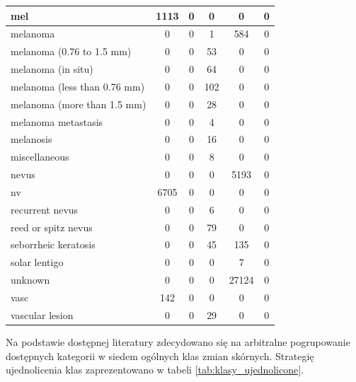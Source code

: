 \begin{table}[htbp]
\begin{tabular}{|l|c|c|c|c|c|}
		mel & 1113 & 0 & 0 & 0 & 0 \\ \hline
		melanoma & 0 & 0 & 1 & 584 & 0 \\ \hline
		melanoma (0.76 to 1.5 mm) & 0 & 0 & 53 & 0 & 0 \\ \hline
		melanoma (in situ) & 0 & 0 & 64 & 0 & 0 \\ \hline
		melanoma (less than 0.76 mm) & 0 & 0 & 102 & 0 & 0 \\ \hline
		melanoma (more than 1.5 mm) & 0 & 0 & 28 & 0 & 0 \\ \hline
		melanoma metastasis & 0 & 0 & 4 & 0 & 0 \\ \hline
		melanosis & 0 & 0 & 16 & 0 & 0 \\ \hline
		miscellaneous & 0 & 0 & 8 & 0 & 0 \\ \hline
		nevus & 0 & 0 & 0 & 5193 & 0 \\ \hline
		nv & 6705 & 0 & 0 & 0 & 0 \\ \hline
		recurrent nevus & 0 & 0 & 6 & 0 & 0 \\ \hline
		reed or spitz nevus & 0 & 0 & 79 & 0 & 0 \\ \hline
		seborrheic keratosis & 0 & 0 & 45 & 135 & 0 \\ \hline
		solar lentigo & 0 & 0 & 0 & 7 & 0 \\ \hline
		unknown & 0 & 0 & 0 & 27124 & 0 \\ \hline
		vasc & 142 & 0 & 0 & 0 & 0 \\ \hline
		vascular lesion & 0 & 0 & 29 & 0 & 0 \\ \hline
	\end{tabular}
	\label{tab:klasy_zbiory}
\end{table}

Na podstawie dostępnej literatury zdecydowano się na arbitralne pogrupowanie dostępnych kategorii w siedem ogólnych klas zmian skórnych. 
Strategię ujednolicenia klas zaprezentowano w tabeli \ref{tab:klasy_ujednolicone}.

